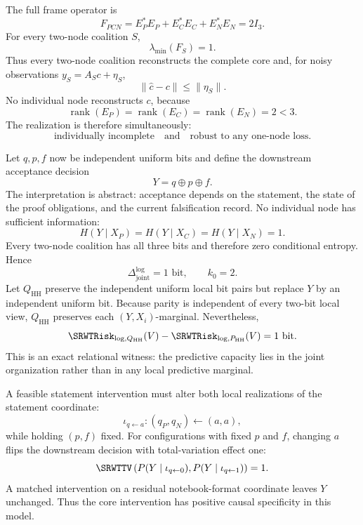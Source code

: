 
The full frame operator is
\[
F_{PCN}=E_P^*E_P+E_C^*E_C+E_N^*E_N=2I_3.
\]
For every two-node coalition \(S\),
\[
\lambda_{\min}(F_S)=1.
\]
Thus every two-node coalition reconstructs the complete core and, for noisy
observations \(y_S=A_Sc+\eta_S\),
\[
\|\widehat c-c\|
\leq
\|\eta_S\|.
\]
No individual node reconstructs \(c\), because
\[
\operatorname{rank}(E_P)
=
\operatorname{rank}(E_C)
=
\operatorname{rank}(E_N)
=2<3.
\]
The realization is therefore simultaneously:
\[
\text{individually incomplete}
\quad\text{and}\quad
\text{robust to any one-node loss}.
\]


Let \(q,p,f\) now be independent uniform bits and define the downstream
acceptance decision
\[
Y=q\oplus p\oplus f.
\]
The interpretation is abstract: acceptance depends on the statement, the state
of the proof obligations, and the current falsification record. No individual
node has sufficient information:
\[
H(Y\mid X_P)
=
H(Y\mid X_C)
=
H(Y\mid X_N)
=1.
\]
Every two-node coalition has all three bits and therefore zero conditional
entropy. Hence
\[
\boxed{
\Delta_{\mathrm{joint}}^{\log}=1\text{ bit},
\qquad
k_0=2.
}
\]
Let \(Q_{\mathrm{HH}}\) preserve the independent uniform local bit pairs but
replace \(Y\) by an independent uniform bit. Because parity is independent of
every two-bit local view, \(Q_{\mathrm{HH}}\) preserves each
\((Y,X_i)\)-marginal. Nevertheless,
\[
\SRWTRisk_{\log,Q_{\mathrm{HH}}}(V)
-
\SRWTRisk_{\log,P_{\mathrm{HH}}}(V)
=1\text{ bit}.
\]
This is an exact relational witness: the predictive capacity lies in the joint
organization rather than in any local predictive marginal.


A feasible statement intervention must alter both local realizations of the
statement coordinate:
\[
\iota_{q\leftarrow a}:
(q_P,q_N)\leftarrow(a,a),
\]
while holding \((p,f)\) fixed. For configurations with fixed \(p\) and \(f\),
changing \(a\) flips the downstream decision with total-variation effect one:
\[
\SRWTTV
\left(
P(Y\mid\iota_{q\leftarrow0}),
P(Y\mid\iota_{q\leftarrow1})
\right)
=1.
\]
A matched intervention on a residual notebook-format coordinate leaves \(Y\)
unchanged. Thus the core intervention has positive causal specificity in this
model.


